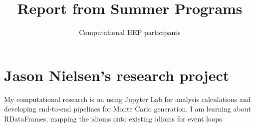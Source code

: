 \documentclass[12pt]{article}
\title{Report from Summer Programs}
\author{Computational HEP participants}
\begin{document}
\maketitle
\section{Jason Nielsen's research project}

My computational research is on using Jupyter Lab for analysis calculations and developing end-to-end pipelines for Monte Carlo generation.
I am learning about RDataFrames, mapping the idioms onto existing idioms for event loops.
\end{document}
